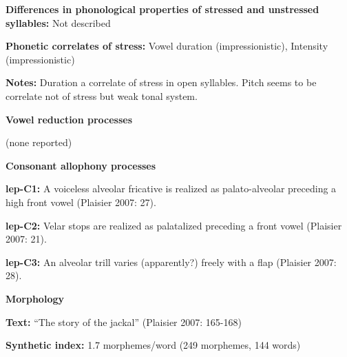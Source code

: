 \begin{styleBody}
\textbf{Differences in phonological properties of stressed and unstressed syllables:} Not described
\end{styleBody}

\begin{styleBody}
\textbf{Phonetic correlates of stress: }Vowel duration (impressionistic), Intensity (impressionistic)
\end{styleBody}

\begin{styleBody}
\textbf{Notes: }Duration a correlate of stress in open syllables. Pitch seems to be correlate not of stress but weak tonal system.
\end{styleBody}

\begin{styleBody}
\textbf{Vowel reduction processes}
\end{styleBody}

\begin{styleBody}
(none reported)
\end{styleBody}

\begin{styleBody}
\textbf{Consonant allophony processes}
\end{styleBody}

\begin{styleBody}
\textbf{lep-C1: }A voiceless alveolar fricative is realized as palato-alveolar preceding a high front vowel (Plaisier 2007: 27).
\end{styleBody}

\begin{styleBody}
\textbf{lep-C2: }Velar stops are realized as palatalized preceding a front vowel (Plaisier 2007: 21).
\end{styleBody}

\begin{styleBody}
\textbf{lep-C3: }An alveolar trill varies (apparently?) freely with a flap (Plaisier 2007: 28).
\end{styleBody}

\begin{styleBody}
\textbf{Morphology}
\end{styleBody}

\begin{styleBody}
\textbf{Text:} “The story of the jackal” (Plaisier 2007: 165-168)
\end{styleBody}

\begin{styleBody}
\textbf{Synthetic index: }1.7 morphemes/word (249 morphemes, 144 words)
\end{styleBody}

